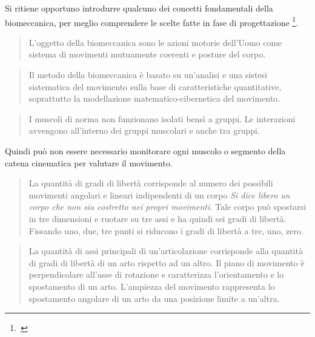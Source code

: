 Si ritiene opportuno introdurre qualcuno dei concetti fondamentali della biomeccanica,
per meglio comprendere le scelte fatte in fase di progettazione
\footnote{\,\cite{cit:donskoi}}.

\begin{quote}
 {L'oggetto} della biomeccanica sono le azioni motorie dell'Uomo come sistema
di movimenti mutuamente coerenti e posture del corpo.
\end{quote}

\begin{quote}
 {Il metodo} della biomeccanica \`e basato su un'analisi e una sistesi sistematica
del movimento sulla base di caratteristiche quantitative,
soprattutto la modellazione matematico-cibernetica del movimento.
\end{quote}


\begin{quote}
I muscoli di norma non funzionano isolati bens\`i a gruppi.
Le interazioni avvengono all'interno dei gruppi muscolari e anche tra gruppi.
\end{quote}
Quindi può non essere necessario monitorare ogni muscolo
o segmento della catena cinematica per valutare il movimento.

\begin{quote}
La quantit\`a di gradi di libert\`a corrisponde al numero dei possibili movimenti
angolari e lineari indipendenti di un corpo
\textit {Si dice \emph {libero} un corpo che non sia costretto nei propri movimenti.}
Tale corpo pu\`o spostarsi in tre dimensioni e ruotare su tre assi
e ha quindi sei gradi di libert\`a.
Fissando uno, due, tre punti si riducono i gradi di libert\`a a tre, uno, zero.
\end{quote}


\begin{quote}
La quantit\`a di assi principali di un'articolazione corrisponde
alla quantit\`a di gradi di libert\`a di un arto rispetto ad un altro.
Il piano di movimento \`e perpendicolare all'asse di rotazione
e caratterizza l'orientamento e lo spostamento di un arto.
L'ampiezza del movimento rappresenta lo spostamento angolare
di un arto da una posizione limite a un'altra.
\end{quote}
